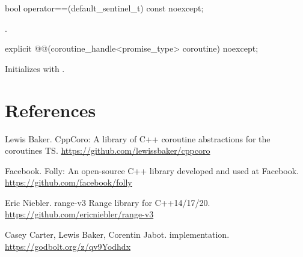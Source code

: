 \documentclass{wg21}
\begin{document}
\begin{addedblock}
\begin{itemdecl}
bool operator==(default_sentinel_t) const noexcept;
\end{itemdecl}

\begin{itemdescr}
\returns
{}.
\end{itemdescr}

\begin{itemdecl}
explicit @@(coroutine_handle<promise_type> coroutine) noexcept;
\end{itemdecl}

\begin{itemdescr}
\effects
Initializes  with .
\end{itemdescr}

\end{addedblock}

\newpage
\section{References}
\renewcommand{\section}[2]{}%



\begin{thebibliography}{9}
    Lewis Baker.
    CppCoro: A library of C++ coroutine abstractions for the coroutines TS.
    \url{https://github.com/lewissbaker/cppcoro}

    Facebook.
    Folly: An open-source C++ library developed and used at Facebook.
    \url{https://github.com/facebook/folly}

    Eric Niebler.
    range-v3 Range library for C++14/17/20.
    \url{https://github.com/ericniebler/range-v3}

    Casey Carter, Lewis Baker, Corentin Jabot.
     implementation.
    \url{https://godbolt.org/z/qv9Yodhdx}
\end{thebibliography}
\end{document}

